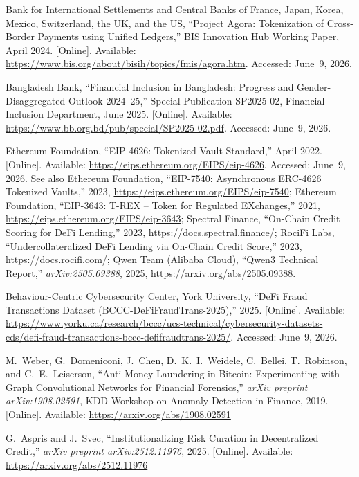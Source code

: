 \documentclass[12pt, a4paper]{report}
\begin{document}
{\begin{enumerate}[label={[\arabic*]}]
\item Bank for International Settlements and Central Banks of France, Japan, Korea, Mexico, Switzerland, the UK, and the US, ``Project Agora: Tokenization of Cross-Border Payments using Unified Ledgers,'' BIS Innovation Hub Working Paper, April 2024. [Online]. Available: \url{https://www.bis.org/about/bisih/topics/fmis/agora.htm}. Accessed: June~9, 2026.

\item Bangladesh Bank, ``Financial Inclusion in Bangladesh: Progress and Gender-Disaggregated Outlook 2024--25,'' Special Publication SP2025-02, Financial Inclusion Department, June 2025. [Online]. Available: \url{https://www.bb.org.bd/pub/special/SP2025-02.pdf}. Accessed: June~9, 2026.

\item Ethereum Foundation, ``EIP-4626: Tokenized Vault Standard,'' April 2022. [Online]. Available: \url{https://eips.ethereum.org/EIPS/eip-4626}. Accessed: June~9, 2026. See also Ethereum Foundation, ``EIP-7540: Asynchronous ERC-4626 Tokenized Vaults,'' 2023, \url{https://eips.ethereum.org/EIPS/eip-7540}; Ethereum Foundation, ``EIP-3643: T-REX -- Token for Regulated EXchanges,'' 2021, \url{https://eips.ethereum.org/EIPS/eip-3643}; Spectral Finance, ``On-Chain Credit Scoring for DeFi Lending,'' 2023, \url{https://docs.spectral.finance/}; RociFi Labs, ``Undercollateralized DeFi Lending via On-Chain Credit Score,'' 2023, \url{https://docs.rocifi.com/}; Qwen Team (Alibaba Cloud), ``Qwen3 Technical Report,'' \textit{arXiv:2505.09388}, 2025, \url{https://arxiv.org/abs/2505.09388}.

\item Behaviour-Centric Cybersecurity Center, York University, ``DeFi Fraud Transactions Dataset (BCCC-DeFiFraudTrans-2025),'' 2025. [Online]. Available: \url{https://www.yorku.ca/research/bccc/ucs-technical/cybersecurity-datasets-cds/defi-fraud-transactions-bccc-defifraudtrans-2025/}. Accessed: June~9, 2026.

\item M.~Weber, G.~Domeniconi, J.~Chen, D.~K.~I.~Weidele, C.~Bellei, T.~Robinson, and C.~E.~Leiserson, ``Anti-Money Laundering in Bitcoin: Experimenting with Graph Convolutional Networks for Financial Forensics,'' \textit{arXiv preprint arXiv:1908.02591}, KDD Workshop on Anomaly Detection in Finance, 2019. [Online]. Available: \url{https://arxiv.org/abs/1908.02591}

\item G.~Aspris and J.~Svec, ``Institutionalizing Risk Curation in Decentralized Credit,'' \textit{arXiv preprint arXiv:2512.11976}, 2025. [Online]. Available: \url{https://arxiv.org/abs/2512.11976}


\end{enumerate}}
\end{document}
